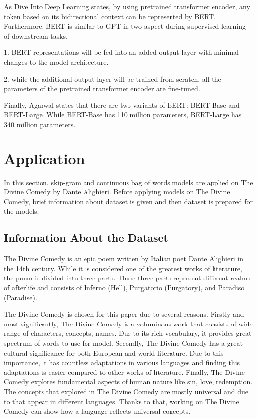 \documentclass[man]{apa7}
\begin{document}
As Dive Into Deep Learning states, by using pretrained transformer encoder, any token based on its bidirectional context can be represented by BERT. Furthermore, BERT is similar to GPT in two aspect during supervised learning of downstream tasks.

1. BERT representations will be fed into an added output layer with minimal changes to the model architecture. 

2. while the additional output layer will be trained from scratch, all the parameters of the pretrained transformer encoder are fine-tuned.

Finally, Agarwal states that there are two variants of BERT: BERT-Base and BERT-Large. While BERT-Base has 110 million parameters, BERT-Large has 340 million parameters.

\section{Application}

In this section, skip-gram and continuous bag of words models are applied on The Divine Comedy by Dante Alighieri. Before applying models on The Divine Comedy, brief information about dataset is given and then dataset is prepared for the models.

\subsection{Information About the Dataset}

The Divine Comedy is an epic poem written by Italian poet Dante Alighieri in the 14th century. While it is considered one of the greatest works of literature, the poem is divided into three parts. Those three parts represent different realms of afterlife and consists of Inferno (Hell), Purgatorio (Purgatory), and Paradiso (Paradise).

The Divine Comedy is chosen for this paper due to several reasons. Firstly and most significantly, The Divine Comedy is a voluminous work that consists of wide range of characters, concepts, names. Due to its rich vocabulary, it provides great spectrum of words to use for model. Secondly, The Divine Comedy has a great cultural significance for both European and world literature. Due to this importance, it has countless adaptations in various languages and finding this adaptations is easier compared to other works of literature. Finally, The Divine Comedy explores fundamental aspects of human nature like sin, love, redemption. The concepts that explored in The Divine Comedy are mostly universal and due to that appear in different languages. Thanks to that, working on The Divine Comedy can show how a language reflects universal concepts.
\end{document}
